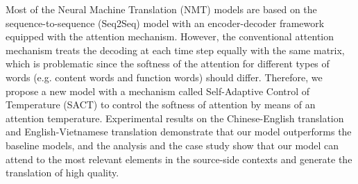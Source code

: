 Most of the Neural Machine Translation (NMT) models are based on the sequence-to-sequence (Seq2Seq) model with an encoder-decoder framework equipped with the attention mechanism. However, the conventional attention mechanism treats the decoding at each time step equally with the same matrix, which is problematic since the softness of the attention for different types of words (e.g. content words and function words) should differ. Therefore, we propose a new model with a mechanism called Self-Adaptive Control of Temperature (SACT) to control the softness of attention by means of an attention temperature. Experimental results on the Chinese-English translation and English-Vietnamese translation demonstrate that our model outperforms the baseline models, and the analysis and the case study show that our model can attend to the most relevant elements in the source-side contexts and generate the translation of high quality.
